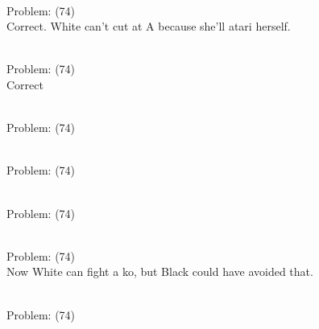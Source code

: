 \documentclass[11pt]{article}
\begin{document}
\begin{minipage}[t]{0.5\textwidth}
  {\centering
  
\\
Problem: (74)\\
Correct. White can't cut at A because she'll atari herself.\\
  }
\end{minipage}
\begin{minipage}[t]{0.5\textwidth}
  {\centering
  
\\
Problem: (74)\\
Correct\\
  }
\end{minipage}
\begin{minipage}[t]{0.5\textwidth}
  {\centering
  
\\
Problem: (74)\\
  }
\end{minipage}
\begin{minipage}[t]{0.5\textwidth}
  {\centering
  
\\
Problem: (74)\\
  }
\end{minipage}
\begin{minipage}[t]{0.5\textwidth}
  {\centering
  
\\
Problem: (74)\\
  }
\end{minipage}
\begin{minipage}[t]{0.5\textwidth}
  {\centering
  
\\
Problem: (74)\\
Now White can fight a ko, but Black could have avoided that.\\
  }
\end{minipage}
\begin{minipage}[t]{0.5\textwidth}
  {\centering
  
\\
Problem: (74)\\
  }
\end{minipage}
\end{document}
